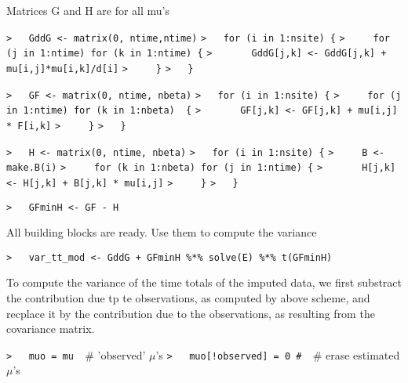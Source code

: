 \documentclass[a4paper]{article}
\begin{document}
Matrices G and H are for all mu's\par

\verb~>   GddG <- matrix(0, ntime,ntime)~\newline
\verb~>   for (i in 1:nsite) {~\newline
\verb~>     for (j in 1:ntime) for (k in 1:ntime) {~\newline
\verb~>       GddG[j,k] <- GddG[j,k] + mu[i,j]*mu[i,k]/d[i]~\newline
\verb~>     }~\newline
\verb~>   }~\par

\verb~>   GF <- matrix(0, ntime, nbeta)~\newline
\verb~>   for (i in 1:nsite) {~\newline
\verb~>     for (j in 1:ntime) for (k in 1:nbeta)  {~\newline
\verb~>       GF[j,k] <- GF[j,k] + mu[i,j] * F[i,k]~\newline
\verb~>     }~\newline
\verb~>   }~\par

\verb~>   H <- matrix(0, ntime, nbeta)~\newline
\verb~>   for (i in 1:nsite) {~\newline
\verb~>     B <- make.B(i)~\newline
\verb~>     for (k in 1:nbeta) for (j in 1:ntime) {~\newline
\verb~>       H[j,k]  <- H[j,k] + B[j,k] * mu[i,j]~\newline
\verb~>     }~\newline
\verb~>   }~\par

\verb~>   GFminH <- GF - H~\par

All building blocks are ready. Use them to compute the variance\par
\verb~>   var_tt_mod <- GddG + GFminH %*% solve(E) %*% t(GFminH)~\par

To compute the variance of the time totals of the imputed data, we first
substract the contribution due tp te observations, as computed by above scheme,
and recplace it by the contribution due to the observations, as resulting from the
covariance matrix.\par
\verb~>   muo = mu  ~{\sffamily\# 'observed' $\mu$'s}\newline
\verb~>   muo[!observed] = 0 #  ~{\sffamily\# erase estimated $\mu$'s}\par
\end{document}
